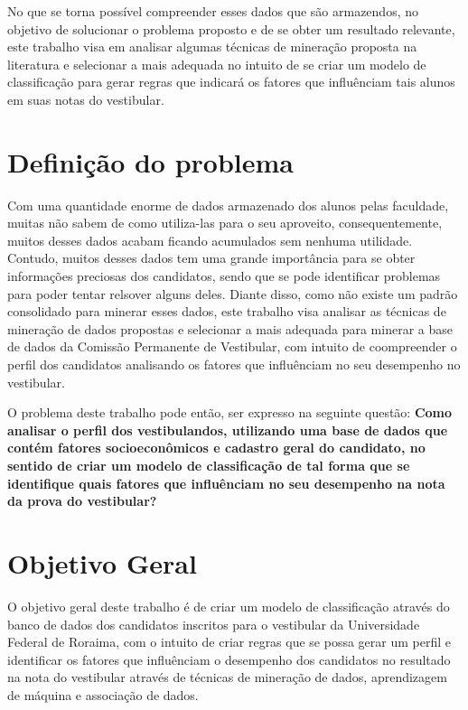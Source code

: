 No que se torna possível compreender esses dados que são armazendos, no objetivo de solucionar o problema proposto e de se obter um resultado relevante, este trabalho visa em analisar algumas técnicas de mineração proposta na literatura e selecionar a mais adequada no intuito de se criar um modelo de classificação para gerar regras que indicará os fatores que influênciam tais alunos em suas notas do vestibular.


\section{Definição do problema}

\par
Com uma quantidade enorme de dados armazenado dos alunos pelas faculdade, muitas não sabem de como utiliza-las para o seu aproveito, consequentemente, muitos desses dados acabam ficando acumulados sem nenhuma utilidade. Contudo, muitos desses dados tem uma grande importância para se obter informações preciosas dos candidatos, sendo que se pode identificar problemas para poder tentar relsover alguns deles. Diante disso, como não existe um padrão consolidado para minerar esses dados, este trabalho visa analisar as técnicas de mineração de dados propostas e selecionar a mais adequada para minerar a base de dados da Comissão Permanente de Vestibular, com intuito de coompreender o perfil dos candidatos analisando os fatores que influênciam no seu desempenho no vestibular.

\par
O problema deste trabalho pode então, ser expresso na seguinte questão: \textbf{Como analisar o perfil dos vestibulandos, utilizando uma base de dados que contém fatores socioeconômicos e cadastro geral do candidato, no sentido de criar um modelo de classificação de tal forma que se identifique quais fatores que influênciam no seu desempenho na nota  da prova do vestibular? }



\section{Objetivo Geral}

O objetivo geral deste trabalho é de criar um modelo de classificação através do banco de dados dos candidatos inscritos para o vestibular da Universidade Federal de Roraima, com o intuito de criar regras que se possa gerar um perfil e identificar os fatores que influênciam o desempenho dos candidatos no resultado na nota do vestibular através de técnicas de mineração de dados, aprendizagem de máquina e associação de dados.


